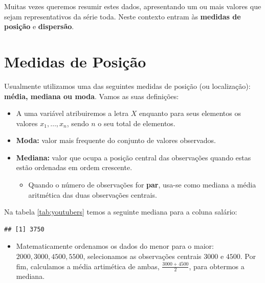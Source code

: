 \documentclass[
]{book}
\newenvironment{Shaded}{\begin{snugshade}}{\end{snugshade}}
\newcommand{\FunctionTok}[1]{\textcolor[rgb]{0.00,0.00,0.00}{#1}}
\newcommand{\NormalTok}[1]{#1}
\newcommand{\SpecialCharTok}[1]{\textcolor[rgb]{0.00,0.00,0.00}{#1}}
\providecommand{\tightlist}{%
  \setlength{\itemsep}{0pt}\setlength{\parskip}{0pt}}
\begin{document}
Muitas vezes queremos resumir estes dados, apresentando um ou mais valores que sejam representativos da série toda. Neste contexto entram às \textbf{medidas de posição} e \textbf{dispersão}.

\hypertarget{medidas-de-posiuxe7uxe3o}{%
\section{Medidas de Posição}\label{medidas-de-posiuxe7uxe3o}}

Usualmente utilizamos uma das seguintes medidas de posição (ou localização): \textbf{média, mediana ou moda}. Vamos as suas definições:

\begin{itemize}
\tightlist
\item
  A uma variável atribuiremos a letra \(X\) enquanto para seus elementos os valores \(x_1, \dots, x_n\), sendo \(n\) o seu total de elementos.
\item
  \textbf{Moda:} valor mais frequente do conjunto de valores observados.
\item
  \textbf{Mediana:} valor que ocupa a posição central das observações quando estas estão ordenadas em ordem crescente.

  \begin{itemize}
  \tightlist
  \item
    Quando o número de observações for \textbf{par}, usa-se como mediana a média aritmética das duas observações centrais.
  \end{itemize}
\end{itemize}

Na tabela \ref{tab:youtubers} temos a seguinte mediana para a coluna salário:

\begin{Shaded}
\end{Shaded}

\begin{verbatim}
## [1] 3750
\end{verbatim}

\begin{itemize}
\tightlist
\item
  Matematicamente ordenamos os dados do menor para o maior: \(2000, 3000, 4500, 5500\), selecionamos as observações centrais \(3000\) e \(4500\). Por fim, calculamos a média artimética de ambas, \(\frac{3000+4500}{2}\), para obtermos a mediana.
\end{itemize}
\end{document}
